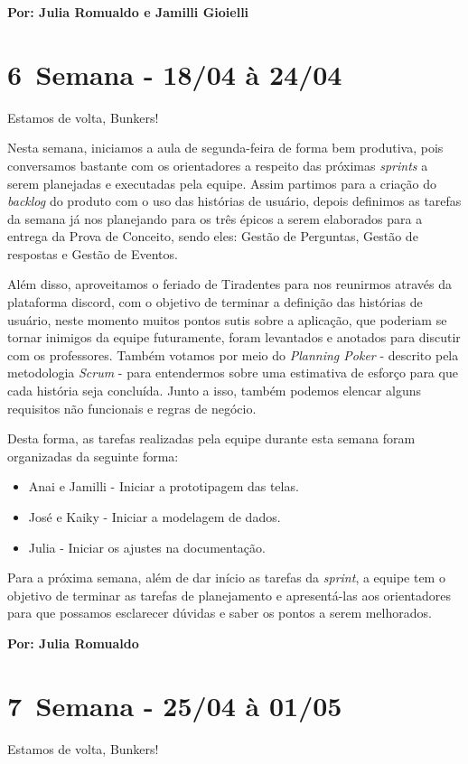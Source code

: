 \textbf{Por: Julia Romualdo e Jamilli Gioielli}

\section{6\textordfeminine \, Semana - 18/04 à 24/04}
Estamos de volta, Bunkers!

Nesta semana, iniciamos a aula de segunda-feira de forma bem produtiva, pois conversamos bastante com os orientadores a respeito das próximas \textsl{sprints} a serem planejadas e executadas pela equipe. Assim partimos para a criação do \textsl{backlog} do produto com o uso das histórias de usuário, depois definimos as tarefas da semana já nos planejando para os três épicos a serem elaborados para a entrega da Prova de Conceito, sendo eles: Gestão de Perguntas, Gestão de respostas e Gestão de Eventos.

Além disso, aproveitamos o feriado de Tiradentes para nos reunirmos através da plataforma \gls{discord}, com o objetivo de terminar a definição das histórias de usuário, neste momento muitos pontos sutis sobre a aplicação, que poderiam se tornar inimigos da equipe futuramente, foram levantados e anotados para discutir com os professores. Também votamos por meio do \textsl{Planning Poker} - descrito pela metodologia \textsl{Scrum} - para entendermos sobre uma estimativa de esforço para que cada história seja concluída. Junto a isso, também podemos elencar alguns requisitos não funcionais e regras de negócio.

Desta forma, as tarefas realizadas pela equipe durante esta semana foram organizadas da seguinte forma:

\begin{itemize}
    \item Anai e Jamilli - Iniciar a prototipagem das telas.
    \item José e Kaiky - Iniciar a modelagem de dados.
    \item Julia - Iniciar os ajustes na documentação.
\end{itemize}

Para a próxima semana, além de dar início as tarefas da \textsl{sprint}, a equipe tem o objetivo de terminar as tarefas de planejamento e apresentá-las aos orientadores para que possamos esclarecer dúvidas e saber os pontos a serem melhorados.

\textbf{Por: Julia Romualdo}

\section{7\textordfeminine \, Semana - 25/04 à 01/05}
Estamos de volta, Bunkers!

